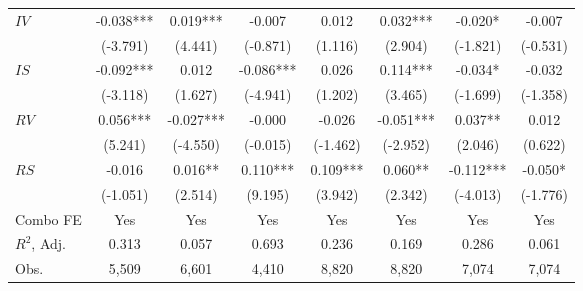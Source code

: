\begin{tabular}{lccccccc}
$IV$ & -0.038*** & 0.019*** & -0.007 & 0.012 & 0.032*** & -0.020* & -0.007 \\
 & (-3.791) & (4.441) & (-0.871) & (1.116) & (2.904) & (-1.821) & (-0.531) \\
$IS$ & -0.092*** & 0.012 & -0.086*** & 0.026 & 0.114*** & -0.034* & -0.032 \\
 & (-3.118) & (1.627) & (-4.941) & (1.202) & (3.465) & (-1.699) & (-1.358) \\
$RV$ & 0.056*** & -0.027*** & -0.000 & -0.026 & -0.051*** & 0.037** & 0.012 \\
 & (5.241) & (-4.550) & (-0.015) & (-1.462) & (-2.952) & (2.046) & (0.622) \\
$RS$ & -0.016 & 0.016** & 0.110*** & 0.109*** & 0.060** & -0.112*** & -0.050* \\
 & (-1.051) & (2.514) & (9.195) & (3.942) & (2.342) & (-4.013) & (-1.776) \\
Combo FE & Yes & Yes & Yes & Yes & Yes & Yes & Yes \\
$R^2$,  Adj. & 0.313 & 0.057 & 0.693 & 0.236 & 0.169 & 0.286 & 0.061 \\
Obs. & 5,509 & 6,601 & 4,410 & 8,820 & 8,820 & 7,074 & 7,074 \\
\bottomrule
\end{tabular}
